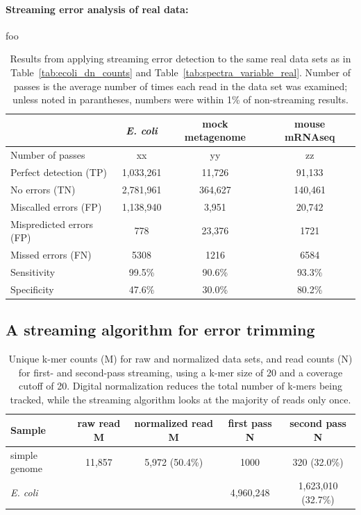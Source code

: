 \documentclass{article}
\begin{document}
\paragraph{Streaming error analysis of real data:}

foo




\begin{table}
\begin{tabular}{|l|c||c||c|}
\hline
& {\em E. coli} & mock metagenome & mouse mRNAseq \\
\hline
Number of passes & xx & yy & zz \\
\hline
Perfect detection (TP)   & 1,033,261 & 11,726  & 91,133 \\
No errors (TN)           & 2,781,961 & 364,627 & 140,461 \\
Miscalled errors (FP)    & 1,138,940 & 3,951   & 20,742 \\
Mispredicted errors (FP) & 778       & 23,376  & 1721 \\
Missed errors (FN)       & 5308      & 1216    & 6584 \\
\hline
Sensitivity            & 99.5\%      & 90.6\%  & 93.3\% \\
Specificity            & 47.6\%      & 30.0\%  &  80.2\% \\
\hline
\end{tabular}
\label{tab:spectra_streaming_real}

\caption{Results from applying streaming error detection to the same
  real data sets as in Table~\ref{tab:ecoli_dn_counts} and
  Table~\ref{tab:spectra_variable_real}.  Number of passes is the average
  number of times each read in the data set was examined; unless noted in
  parantheses, numbers were within 1\% of non-streaming results.}
\end{table}

\subsection{A streaming algorithm for error trimming}

\begin{table}
\begin{tabular}{|l|c|c|c|c|}
\hline
Sample & raw read M & normalized read M & first pass N & second pass N \\
\hline
simple genome & 11,857 & 5,972 (50.4\%) & 1000 & 320 (32.0\%) \\
{\em E. coli} & & & 4,960,248 & 1,623,010 (32.7\%) \\
\hline
\end{tabular}
\label{tab:streaming_counts}

\caption{Unique k-mer counts (M) for raw and normalized data sets, and
read counts (N) for first- and second-pass streaming, using a k-mer size
of 20 and a coverage cutoff of 20.  Digital normalization reduces the
total number of k-mers being tracked, while the streaming algorithm
looks at the majority of reads only once.}
\end{table}
\end{document}
